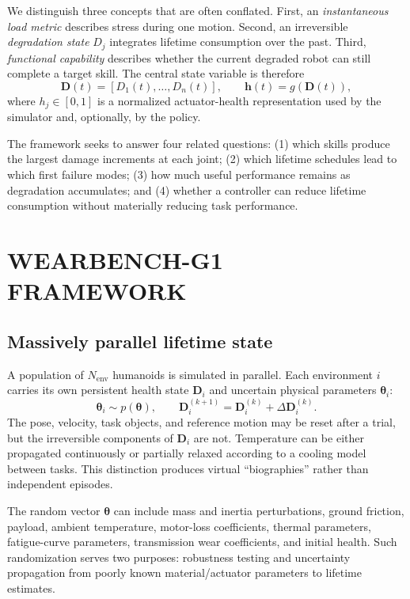\documentclass[letterpaper,10pt,conference]{ieeeconf}
\begin{document}
We distinguish three concepts that are often conflated. First, an \emph{instantaneous load metric} describes stress during one motion. Second, an irreversible \emph{degradation state} $D_j$ integrates lifetime consumption over the past. Third, \emph{functional capability} describes whether the current degraded robot can still complete a target skill. The central state variable is therefore
\begin{equation}
\mathbf{D}(t)=[D_1(t),\ldots,D_n(t)], \qquad
\mathbf{h}(t)=g(\mathbf{D}(t)),
\label{eq:health}
\end{equation}
where $h_j\in[0,1]$ is a normalized actuator-health representation used by the simulator and, optionally, by the policy.

The framework seeks to answer four related questions: (1) which skills produce the largest damage increments at each joint; (2) which lifetime schedules lead to which first failure modes; (3) how much useful performance remains as degradation accumulates; and (4) whether a controller can reduce lifetime consumption without materially reducing task performance.

\section{WEARBENCH-G1 FRAMEWORK}

\subsection{Massively parallel lifetime state}

A population of $N_{\mathrm{env}}$ humanoids is simulated in parallel. Each environment $i$ carries its own persistent health state $\mathbf{D}_i$ and uncertain physical parameters $\boldsymbol{\theta}_i$:
\begin{equation}
\boldsymbol{\theta}_i \sim p(\boldsymbol{\theta}), \qquad
\mathbf{D}_i^{(k+1)}=
\mathbf{D}_i^{(k)}+\Delta\mathbf{D}_i^{(k)}.
\label{eq:persistence}
\end{equation}
The pose, velocity, task objects, and reference motion may be reset after a trial, but the irreversible components of $\mathbf{D}_i$ are not. Temperature can be either propagated continuously or partially relaxed according to a cooling model between tasks. This distinction produces virtual ``biographies'' rather than independent episodes.

The random vector $\boldsymbol{\theta}$ can include mass and inertia perturbations, ground friction, payload, ambient temperature, motor-loss coefficients, thermal parameters, fatigue-curve parameters, transmission wear coefficients, and initial health. Such randomization serves two purposes: robustness testing and uncertainty propagation from poorly known material/actuator parameters to lifetime estimates.
\end{document}

